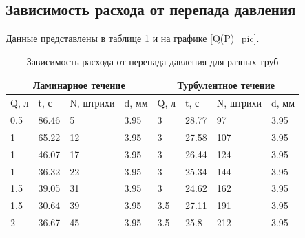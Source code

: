 \documentclass[a4paper,12pt]{article} %
\begin{document}
\subsection{Зависимость расхода от перепада давления}
Данные представлены в таблице \ref{Q(P)_tbl} и на графике \ref{Q(P)_pic}.
\begin{table}[h!]
\caption{Зависимость расхода от перепада давления для разных труб}
\label{Q(P)_tbl}
\begin{tabular}{|llll|llll|}
\hline
\multicolumn{4}{|c|}{Ламинарное течение}                                                  & \multicolumn{4}{c|}{Турбулентное течение}                                               \\ \hline
\multicolumn{1}{|l|}{Q, л}   & \multicolumn{1}{l|}{t, с}     & \multicolumn{1}{l|}{N, штрихи}    & d, мм  &\multicolumn{1}{|l|}{Q, л}   & \multicolumn{1}{l|}{t, с}     & \multicolumn{1}{l|}{N, штрихи}    & d, мм   \\ \hline
\multicolumn{1}{|l|}{0.5} & \multicolumn{1}{l|}{86.46} & \multicolumn{1}{l|}{5}    & 3.95 & \multicolumn{1}{l|}{3}   & \multicolumn{1}{l|}{28.77} & \multicolumn{1}{l|}{97}  & 3.95 \\ \hline
\multicolumn{1}{|l|}{1}   & \multicolumn{1}{l|}{65.22} & \multicolumn{1}{l|}{12}   & 3.95 & \multicolumn{1}{l|}{3}   & \multicolumn{1}{l|}{27.58} & \multicolumn{1}{l|}{107} & 3.95 \\ \hline
\multicolumn{1}{|l|}{1}   & \multicolumn{1}{l|}{46.07} & \multicolumn{1}{l|}{17}   & 3.95 & \multicolumn{1}{l|}{3}   & \multicolumn{1}{l|}{26.44} & \multicolumn{1}{l|}{124} & 3.95 \\ \hline
\multicolumn{1}{|l|}{1}   & \multicolumn{1}{l|}{36.32} & \multicolumn{1}{l|}{22}   & 3.95 & \multicolumn{1}{l|}{3}   & \multicolumn{1}{l|}{25.34} & \multicolumn{1}{l|}{144} & 3.95 \\ \hline
\multicolumn{1}{|l|}{1.5} & \multicolumn{1}{l|}{39.05} & \multicolumn{1}{l|}{31}   & 3.95 & \multicolumn{1}{l|}{3}   & \multicolumn{1}{l|}{24.62} & \multicolumn{1}{l|}{162} & 3.95 \\ \hline
\multicolumn{1}{|l|}{1.5} & \multicolumn{1}{l|}{30.64} & \multicolumn{1}{l|}{39}   & 3.95 & \multicolumn{1}{l|}{3.5} & \multicolumn{1}{l|}{27.11} & \multicolumn{1}{l|}{191} & 3.95 \\ \hline
\multicolumn{1}{|l|}{2}   & \multicolumn{1}{l|}{36.67} & \multicolumn{1}{l|}{45}   & 3.95 & \multicolumn{1}{l|}{3.5} & \multicolumn{1}{l|}{25.8}  & \multicolumn{1}{l|}{212} & 3.95 \\ \hline

\end{tabular}
\end{table}
\end{document}
